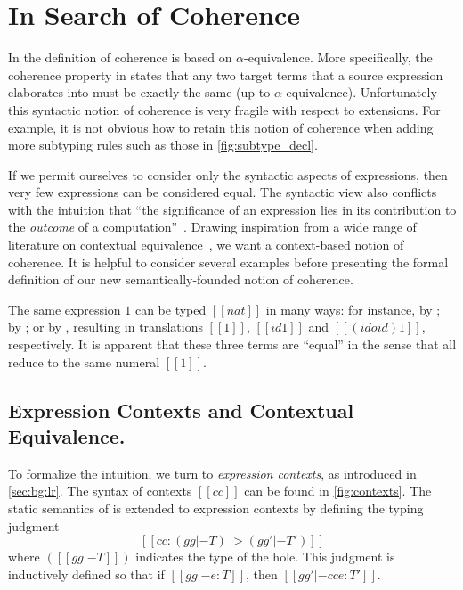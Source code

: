 \section{In Search of Coherence}

In \oname the definition of coherence is based on
$\alpha$-equivalence. More specifically, the coherence property in \oname states that
any two target terms that a source expression elaborates into must be exactly the same (up to
$\alpha$-equivalence). Unfortunately this syntactic notion of coherence is
very fragile with respect to extensions.
For example, it is not obvious how to retain this notion of coherence when adding more subtyping
rules such as those in \cref{fig:subtype_decl}.

If we permit ourselves to consider only the syntactic aspects of expressions,
then very few expressions can be considered equal. The syntactic view also conflicts
with the intuition that ``the significance of an expression lies in its
contribution to the \textit{outcome} of a computation''~\citep{Harper_2016}.
Drawing inspiration from a wide range of literature on contextual
equivalence~\citep{morris1969lambda}, we want a context-based notion of
coherence. It is helpful to consider several examples before presenting the
formal definition of our new semantically-founded notion of coherence.

\begin{example} \label{eg:1}
The same \namee expression $1$ can be typed $[[nat]]$ in many ways: for instance, by ; by
; or by , resulting in translations
$[[1]]$, $[[id 1]]$ and $[[ (id o id) 1 ]]$, respectively. It is apparent
that these three \tname terms are ``equal'' in the sense that all reduce to the same numeral $[[1]]$.
\end{example}

\subsection{Expression Contexts and Contextual Equivalence.}

To formalize the intuition, we turn to \textit{expression contexts}, as
introduced in \cref{sec:bg:lr}. The syntax of \tname contexts $[[cc]]$ can be found in
\cref{fig:contexts}. The static semantics of \tname is extended to expression
contexts by defining the typing judgment
\[
  [[cc : (gg |- T) ~> (gg' |- T')]]
\]
where $([[gg |- T]])$ indicates the type of the hole. This judgment is
inductively defined so that if $[[gg |- e : T]]$, then $[[gg' |- cc{e} : T']]$.

